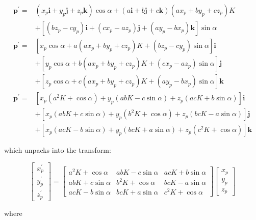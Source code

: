 $$
\begin{aligned}
\mathbf{p}^{\prime}= & \left(x_{p} \mathbf{i}+y_{p} \mathbf{j}+z_{p} \mathbf{k}\right) \cos \alpha+(a \mathbf{i}+b \mathbf{j}+c \mathbf{k})\left(a x_{p}+b y_{p}+c z_{p}\right) K \\
& +\left[\left(b z_{p}-c y_{p}\right) \mathbf{i}+\left(c x_{p}-a z_{p}\right) \mathbf{j}+\left(a y_{p}-b x_{p}\right) \mathbf{k}\right] \sin \alpha \\
\mathbf{p}^{\prime}= & {\left[x_{p} \cos \alpha+a\left(a x_{p}+b y_{p}+c z_{p}\right) K+\left(b z_{p}-c y_{p}\right) \sin \alpha\right] \mathbf{i} } \\
& +\left[y_{p} \cos \alpha+b\left(a x_{p}+b y_{p}+c z_{p}\right) K+\left(c x_{p}-a z_{p}\right) \sin \alpha\right] \mathbf{j} \\
& +\left[z_{p} \cos \alpha+c\left(a x_{p}+b y_{p}+c z_{p}\right) K+\left(a y_{p}-b x_{p}\right) \sin \alpha\right] \mathbf{k} \\
\mathbf{p}^{\prime}= & {\left[x_{p}\left(a^{2} K+\cos \alpha\right)+y_{p}(a b K-c \sin \alpha)+z_{p}(a c K+b \sin \alpha)\right] \mathbf{i} } \\
& +\left[x_{p}(a b K+c \sin \alpha)+y_{p}\left(b^{2} K+\cos \alpha\right)+z_{p}(b c K-a \sin \alpha)\right] \mathbf{j} \\
& +\left[x_{p}(a c K-b \sin \alpha)+y_{p}(b c K+a \sin \alpha)+z_{p}\left(c^{2} K+\cos \alpha\right)\right] \mathbf{k}
\end{aligned}
$$

which unpacks into the transform:

$$
\left[\begin{array}{c}
x_{p}^{\prime} \\
y_{p}^{\prime} \\
z_{p}^{\prime}
\end{array}\right]=\left[\begin{array}{ccc}
a^{2} K+\cos \alpha & a b K-c \sin \alpha & a c K+b \sin \alpha \\
a b K+c \sin \alpha & b^{2} K+\cos \alpha & b c K-a \sin \alpha \\
a c K-b \sin \alpha & b c K+a \sin \alpha & c^{2} K+\cos \alpha
\end{array}\right]\left[\begin{array}{c}
x_{p} \\
y_{p} \\
z_{p}
\end{array}\right]
$$

where

